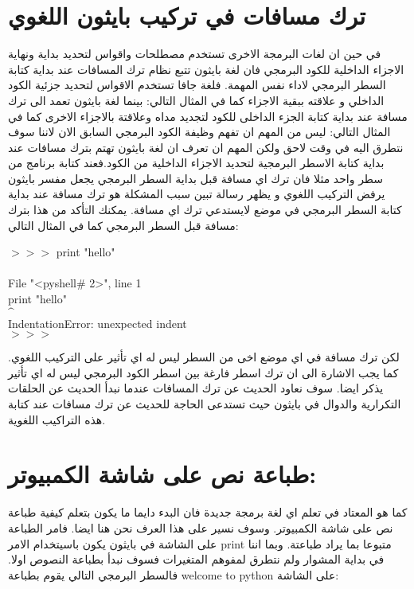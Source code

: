 \section{ترك مسافات في تركيب بايثون اللغوي}
في حين ان لغات البرمجة الاخرى تستخدم مصطلحات واقواس لتحديد بداية ونهاية الاجزاء  الداخلية للكود البرمجي فان لغة بايثون تتبع نظام ترك المسافات عند بداية كتابة السطر البرمجي لاداء نفس المهمة. فلغة جافا تستخدم الاقواس لتحديد جزئية الكود الداخلي و علاقته ببقية الاجزاء كما في المثال التالي:
بينما لغة بايثون تعمد الى ترك مسافة عند بداية كتابة الجزء الداخلى للكود لتجديد مداه وعلاقتة بالاجزاء الاخرى كما في المثال التالي:
ليس من المهم ان تفهم وظيفة الكود البرمجي السابق الان لاننا سوف نتطرق اليه في وقت لاحق ولكن المهم ان تعرف ان لغة بايثون تهتم بترك مسافات عند بداية كتابة الاسطر البرمجية لتحديد الاجزاء الداخلية من الكود.فعند كتابة برنامج من سطر واحد مثلا فان ترك اي مسافة قبل بداية السطر البرمجي يجعل مفسر بايثون يرفض التركيب اللغوي و يظهر رسالة تبين سبب المشكلة هو ترك مسافة عند بداية كتابة السطر البرمجي في موضع لايستدعي ترك اي مسافة. يمكنك التأكد من هذا بترك مسافة قبل السطر البرمجي كما في المثال التالي:
\begin{english}
\begin{tcolorbox}
$>>>$     print "hello" \\
    \\
  File "<pyshell\# 2>", line 1 \\
    \quad print "hello"  \\
   $\^$ \\
IndentationError: unexpected indent \\
$>>>$ 
\end{tcolorbox}
\end{english}
لكن ترك مسافة في اي موضع اخى من السطر ليس له اي تأثير على التركيب اللغوي. كما يجب الاشارة الى ان ترك اسطر فارغة بين اسطر الكود البرمجي ليس له اي تأثير يذكر ايضا. سوف نعاود الحديث عن ترك المسافات عندما نبدأ الحديث عن الحلقات التكرارية والدوال في بايثون حيث تستدعى الحاجة للحديث عن ترك مسافات عند كتابة هذه التراكيب اللغوية.
\section{طباعة نص على شاشة الكمبيوتر:}
كما هو المعتاد في تعلم اي لغة برمجة جديدة فان البدء دايما ما يكون بتعلم كيفية طباعة نص على شاشة الكمبيوتر. وسوف نسير على هذا العرف نحن هنا ايضا. فامر الطباعة على الشاشة في بايثون يكون باسيتخدام الامر print متبوعا بما يراد طباعتة. وبما اننا في بداية المشوار ولم نتطرق لمفوهم المتغيرات فسوف نبدأ بطباعة النصوص اولا. فالسطر البرمجي  التالي يقوم بطباعة
welcome to python
 على الشاشة:

